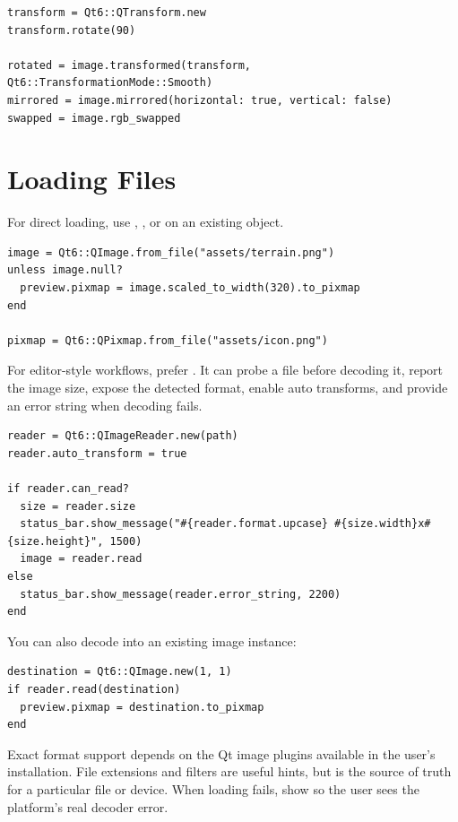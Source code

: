\begin{lstlisting}[style=crystal]
transform = Qt6::QTransform.new
transform.rotate(90)

rotated = image.transformed(transform, Qt6::TransformationMode::Smooth)
mirrored = image.mirrored(horizontal: true, vertical: false)
swapped = image.rgb_swapped
\end{lstlisting}

\section{Loading Files}

For direct loading, use , , or  on an existing object.

\begin{lstlisting}[style=crystal]
image = Qt6::QImage.from_file("assets/terrain.png")
unless image.null?
  preview.pixmap = image.scaled_to_width(320).to_pixmap
end

pixmap = Qt6::QPixmap.from_file("assets/icon.png")
\end{lstlisting}

For editor-style workflows, prefer . It can probe a file before decoding it, report the image size, expose the detected format, enable auto transforms, and provide an error string when decoding fails.

\begin{lstlisting}[style=crystal]
reader = Qt6::QImageReader.new(path)
reader.auto_transform = true

if reader.can_read?
  size = reader.size
  status_bar.show_message("#{reader.format.upcase} #{size.width}x#{size.height}", 1500)
  image = reader.read
else
  status_bar.show_message(reader.error_string, 2200)
end
\end{lstlisting}

You can also decode into an existing image instance:

\begin{lstlisting}[style=crystal]
destination = Qt6::QImage.new(1, 1)
if reader.read(destination)
  preview.pixmap = destination.to_pixmap
end
\end{lstlisting}

Exact format support depends on the Qt image plugins available in the user's installation. File extensions and filters are useful hints, but  is the source of truth for a particular file or device. When loading fails, show  so the user sees the platform's real decoder error.

